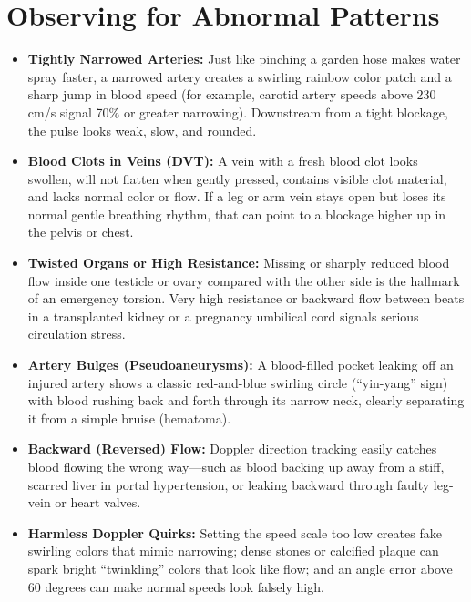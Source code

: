 \section{Observing for Abnormal Patterns}
\begin{itemize}
\item \textbf{Tightly Narrowed Arteries:} Just like pinching a garden hose makes water spray faster, a narrowed artery creates a swirling rainbow color patch and a sharp jump in blood speed (for example, carotid artery speeds above 230 cm/s signal 70\% or greater narrowing). Downstream from a tight blockage, the pulse looks weak, slow, and rounded.
\item \textbf{Blood Clots in Veins (DVT):} A vein with a fresh blood clot looks swollen, will not flatten when gently pressed, contains visible clot material, and lacks normal color or flow. If a leg or arm vein stays open but loses its normal gentle breathing rhythm, that can point to a blockage higher up in the pelvis or chest.
\item \textbf{Twisted Organs or High Resistance:} Missing or sharply reduced blood flow inside one testicle or ovary compared with the other side is the hallmark of an emergency torsion. Very high resistance or backward flow between beats in a transplanted kidney or a pregnancy umbilical cord signals serious circulation stress.
\item \textbf{Artery Bulges (Pseudoaneurysms):} A blood-filled pocket leaking off an injured artery shows a classic red-and-blue swirling circle (``yin-yang'' sign) with blood rushing back and forth through its narrow neck, clearly separating it from a simple bruise (hematoma).
\item \textbf{Backward (Reversed) Flow:} Doppler direction tracking easily catches blood flowing the wrong way---such as blood backing up away from a stiff, scarred liver in portal hypertension, or leaking backward through faulty leg-vein or heart valves.
\item \textbf{Harmless Doppler Quirks:} Setting the speed scale too low creates fake swirling colors that mimic narrowing; dense stones or calcified plaque can spark bright ``twinkling'' colors that look like flow; and an angle error above 60 degrees can make normal speeds look falsely high.
\end{itemize}

